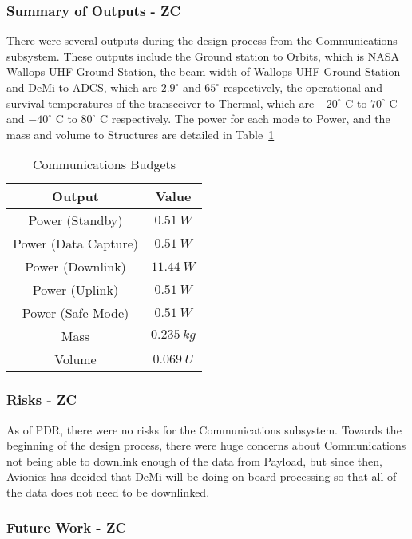 \documentclass[12pt]{article}
\begin{document}
			\subsubsection{Summary of Outputs - ZC}

There were several outputs during the design process from the Communications subsystem. These outputs include the Ground station to Orbits, which is NASA Wallops UHF Ground Station, the beam width of Wallops UHF Ground Station and DeMi to ADCS, which are $2.9^\circ$ and $65^\circ$ respectively, the operational and survival temperatures of the transceiver to Thermal, which are $-20^\circ$ C to $70^\circ$ C and $-40^\circ$ C to $80^\circ$ C respectively. The power for each mode to Power, and the mass and volume to Structures are detailed in Table~\ref{table:comm_summary_outputs}

\begin{table}[ht]
\caption{Communications Budgets}
\begin{center}
    \begin{tabular}{|c||c|} \hline
    	Output & Value \\ \hline \hline
    Power (Standby) & $0.51\ W$  \\
    Power (Data Capture) & $0.51\ W$ \\
    Power (Downlink) & $11.44\ W$ \\
    Power (Uplink) & $0.51\ W$ \\
    Power (Safe Mode) & $0.51\ W$ \\
    Mass & $0.235\ kg$  \\
    Volume & $0.069\ U$ \\ \hline 
    \end{tabular}
\end{center}
\label{table:comm_summary_outputs}
\end{table}

			\subsubsection{Risks - ZC}

As of PDR, there were no risks for the Communications subsystem. Towards the beginning of the design process, there were huge concerns about Communications not being able to downlink enough of the data from Payload, but since then, Avionics has decided that DeMi will be doing on-board processing so that all of the data does not need to be downlinked.

			\subsubsection{Future Work - ZC}
\end{document}
